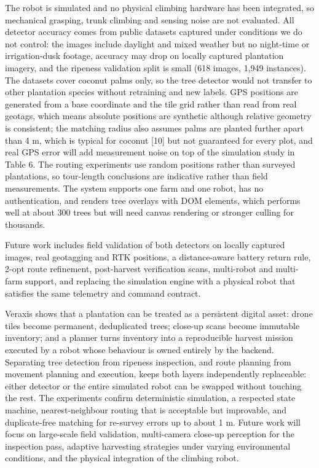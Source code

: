 \documentclass[10pt,a4paper]{article}
\newcommand{\irjsec}[1]{\par\vspace{6pt}\noindent{\cambria\bfseries\fontsize{12}{14}\selectfont\textbullet~#1}\par\vspace{3pt}}
\begin{document}
\irjsec{LIMITATIONS AND FUTURE WORK}
The robot is simulated and no physical climbing hardware has been integrated, so mechanical grasping, trunk climbing and sensing noise are not evaluated. All detector accuracy comes from public datasets captured under conditions we do not control: the images include daylight and mixed weather but no night-time or irrigation-dusk footage, accuracy may drop on locally captured plantation imagery, and the ripeness validation split is small (618 images, 1,949 instances). The datasets cover coconut palms only, so the tree detector would not transfer to other plantation species without retraining and new labels. GPS positions are generated from a base coordinate and the tile grid rather than read from real geotags, which means absolute positions are synthetic although relative geometry is consistent; the matching radius also assumes palms are planted further apart than 4 m, which is typical for coconut [10] but not guaranteed for every plot, and real GPS error will add measurement noise on top of the simulation study in Table 6. The routing experiments use random positions rather than surveyed plantations, so tour-length conclusions are indicative rather than field measurements. The system supports one farm and one robot, has no authentication, and renders tree overlays with DOM elements, which performs well at about 300 trees but will need canvas rendering or stronger culling for thousands.

Future work includes field validation of both detectors on locally captured images, real geotagging and RTK positions, a distance-aware battery return rule, 2-opt route refinement, post-harvest verification scans, multi-robot and multi-farm support, and replacing the simulation engine with a physical robot that satisfies the same telemetry and command contract.

\irjsec{CONCLUSION}
Veraxis shows that a plantation can be treated as a persistent digital asset: drone tiles become permanent, deduplicated trees; close-up scans become immutable inventory; and a planner turns inventory into a reproducible harvest mission executed by a robot whose behaviour is owned entirely by the backend. Separating tree detection from ripeness inspection, and route planning from movement planning and execution, keeps both layers independently replaceable: either detector or the entire simulated robot can be swapped without touching the rest. The experiments confirm deterministic simulation, a respected state machine, nearest-neighbour routing that is acceptable but improvable, and duplicate-free matching for re-survey errors up to about 1 m. Future work will focus on large-scale field validation, multi-camera close-up perception for the inspection pass, adaptive harvesting strategies under varying environmental conditions, and the physical integration of the climbing robot.
\end{document}
